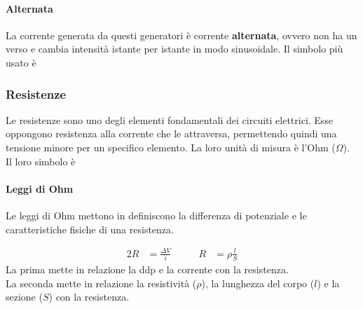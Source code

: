 \paragraph{Alternata}
La corrente generata da questi generatori è corrente \textbf{alternata}, ovvero non ha un verso
e cambia intensità istante per istante in modo sinusoidale. Il simbolo più usato è
\begin{center}
\end{center}

\subsubsection{Resistenze}
Le resistenze sono uno degli elementi fondamentali dei circuiti elettrici. Esse oppongono 
resistenza alla corrente che le attraversa, permettendo quindi una tensione minore per un specifico
elemento. La loro unità di misura è l'Ohm ($\Omega$).\\
Il loro simbolo è
\begin{center}
\end{center}

\paragraph{Leggi di Ohm}\label{par:circElettr:elem:res:ohm}
Le leggi di Ohm mettono in definiscono la differenza di potenziale e le caratteristiche fisiche di 
una resistenza.

\begin{alignat*}{2}
  R &= \frac{\Delta V}{i} &\qquad R &= \rho\frac{l}{S}
\end{alignat*}
La prima mette in relazione la ddp e la corrente con la resistenza.\\
La seconda mette in relazione la resistività ($\rho$), la lunghezza del corpo ($l$) e la sezione 
($S$) con la resistenza.

